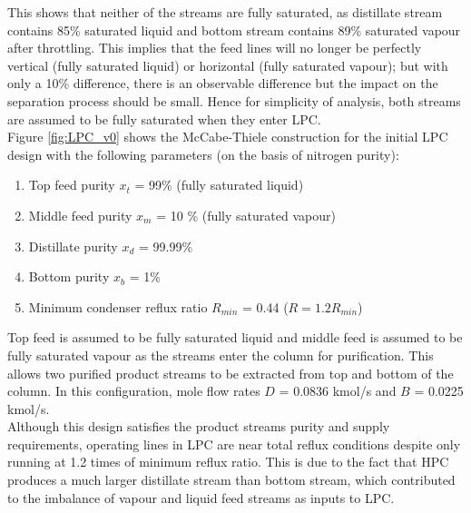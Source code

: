         \noindent This shows that neither of the streams are fully saturated, as distillate stream contains 85\% saturated liquid and bottom stream contains 89\% saturated vapour after throttling. This implies that the feed lines will no longer be perfectly vertical (fully saturated liquid) or horizontal (fully saturated vapour); but with only a 10\% difference, there is an observable difference but the impact on the separation process should be small. Hence for simplicity of analysis, both streams are assumed to be fully saturated when they enter LPC.\\
        
        Figure \ref{fig:LPC_v0} shows the McCabe-Thiele construction for the initial LPC design with the following parameters (on the basis of nitrogen purity):
        \begin{enumerate}
            \item Top feed purity $x_t$ = 99\% (fully saturated liquid)
            \item Middle feed purity $x_m$ = 10 \% (fully saturated vapour)
            \item Distillate purity $x_d$ = 99.99\%
            \item Bottom purity $x_b$ = 1\%
            \item Minimum condenser reflux ratio $R_{min}$ = 0.44 ($R = 1.2R_{min}$)
        \end{enumerate}
        Top feed is assumed to be fully saturated liquid and middle feed is assumed to be fully saturated vapour as the streams enter the column for purification. This allows two purified product streams to be extracted from top and bottom of the column. In this configuration, mole flow rates $D$ = 0.0836 kmol/s and $B$ = 0.0225 kmol/s. \\
        Although this design satisfies the product streams purity and supply requirements,  operating lines in LPC are near total reflux conditions despite only running at 1.2 times of minimum reflux ratio. This is due to the fact that HPC produces a much larger distillate stream than bottom stream, which contributed to the imbalance of vapour and liquid feed streams as inputs to LPC. \\
        

